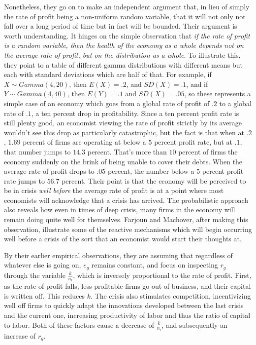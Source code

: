Nonetheless, they go on to make an independent argument that, in lieu of simply the rate of profit being a non-uniform random variable, that it will not only not fall over a long period of time but in fact will be bounded. Their argument is worth understanding. It hinges on the simple observation that \textit{if the rate of profit is a random variable, then the health of the economy as a whole depends not on the average rate of profit, but on the distribution as a whole.} To illustrate this, they point to a table of different gamma distributions with different means but each with standard deviations which are half of that. For example, if $X \sim Gamma(4,20)$, then $E(X) = .2$, and $SD(X) = .1$, and if $Y \sim Gamma(4,40)$, then $E(Y) = .1$ and $SD(X) = .05$, so these represents a simple case of an economy which goes from a global rate of profit of $.2$ to a global rate of $.1$, a ten percent drop in profitability. Since a ten percent profit rate is still plenty good, an economist viewing the rate of profit strictly by its average wouldn't see this drop as particularly catastrophic, but the fact is that when at $.2$, $1.69$ percent of firms are operating at below a $5$ percent profit rate, but at $.1$, that number jumps to $14.3$ percent. That's more than $10$ percent of firms the economy suddenly on the brink of being unable to cover their debts. When the average rate of profit drops to $.05$ percent, the number below a $5$ percent profit rate jumps to $56.7$ percent. Their point is that the economy will be perceived to be in crisis \textit{well before} the average rate of profit is at a point where most economists will acknowledge that a crisis has arrived. The probabilistic approach also reveals how even in times of deep crisis, many firms in the economy will remain doing quite well for themselves. Farjoun and Machover, after making this observation, illustrate some of the reactive mechanisms which will begin occurring well before a crisis of the sort that an economist would start their thoughts at.\par 
By their earlier empirical observations, they are assuming that regardless of whatever else is going on, $e_g$ remains constant, and focus on inspecting $r_g$ through the variable $\frac{k}{n_l}$, which is inversely proportional to the rate of profit. First, as the rate of profit falls, less profitable firms go out of business, and their capital is written off. This reduces $k$. The crisis also stimulates competition, incentivizing well off firms to quickly adapt the innovations developed between the last crisis and the current one, increasing productivity of labor and thus the ratio of capital to labor. Both of these factors cause a decrease of $\frac{k}{n_l}$, and subsequently an increase of $r_g$. \par 
